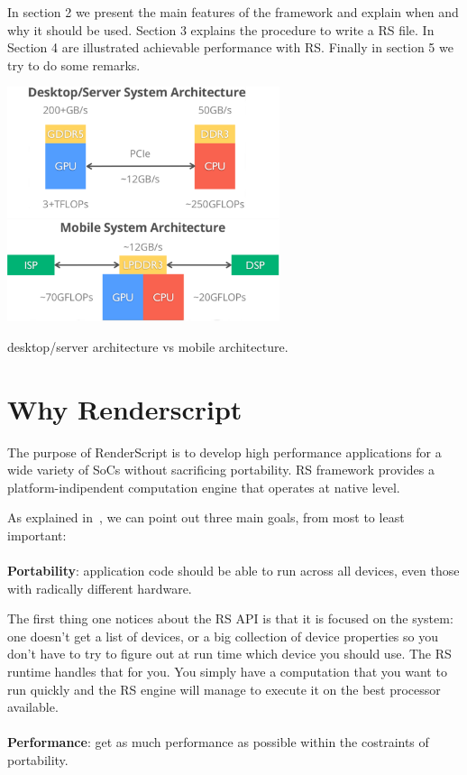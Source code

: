 \documentclass[a4paper,10pt]{article}
\makeatletter
\newenvironment{figurehere}{\def\@captype{figure}\vspace{2ex}}{\vspace{2ex}}
\makeatother
\begin{document}
\begin{multicols}{2}
In section 2 we present the main features of the framework and explain when and why it should be used.
Section 3 explains the procedure to write a RS file.
In Section 4 are illustrated achievable performance with RS. 
Finally in section 5 we try to do some remarks.

\begin{figurehere}
 \centering
 \includegraphics[width=8cm]{./pictures/desktopvsmobile}
 \caption{desktop/server architecture vs mobile architecture.}
 \label{fig:deskmob}
\end{figurehere}

\section{Why Renderscript}
The purpose of RenderScript is to develop high performance applications for a wide variety of SoCs without sacrificing portability. RS framework provides a platform-indipendent computation engine that operates at native level.

As explained in~\cite{}, we can point out three main goals, from most to least important:
\\\\
{\bf Portability}: application code should be able to run across all devices, even those with radically different hardware.

The first thing one notices about the RS API is that it is focused on the system: one doesn't get a list of devices, or a big collection of device properties so you don't have to try to figure out at run time which device you should use. The RS runtime handles that for you. You simply have a computation that you want to run quickly and the RS engine will manage to execute it on the best processor available.
\\\\
{\bf Performance}: get as much performance as possible within the costraints of portability.


\end{multicols}
\end{document}
